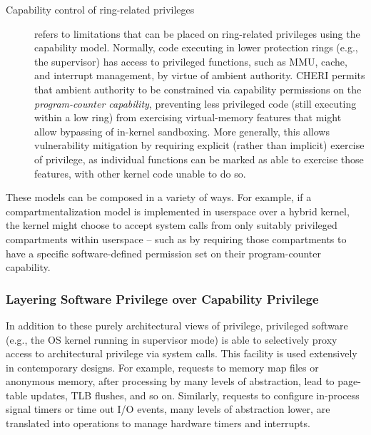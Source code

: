 \begin{description}
\item[Capability control of ring-related privileges] refers to limitations
  that can be placed on ring-related privileges using the capability model.
  Normally, code executing in lower protection rings (e.g., the supervisor) has
  access to privileged functions, such as MMU, cache, and interrupt
  management, by virtue of ambient authority.
  CHERI permits that ambient authority to be constrained via capability
  permissions on the \textit{program-counter capability}, preventing less
  privileged code (still executing within a low ring) from exercising
  virtual-memory features that might allow bypassing of in-kernel sandboxing.
  More generally, this allows vulnerability mitigation by requiring
  explicit (rather than implicit) exercise of privilege, as individual
  functions can be marked as able to exercise those features, with other
  kernel code unable to do so.
\end{description}

These models can be composed in a variety of ways.
For example, if a compartmentalization model is implemented in userspace over
a hybrid kernel, the kernel might choose to accept system calls from only
suitably privileged compartments within userspace -- such as by requiring
those compartments to have a specific software-defined permission set on their
program-counter capability.

\subsubsection{Layering Software Privilege over Capability Privilege}

In addition to these purely architectural views of privilege, privileged
software (e.g., the OS kernel running in supervisor mode) is able to
selectively proxy access to architectural privilege via system calls.
This facility is used extensively in contemporary designs.
For example, requests to memory
map files or anonymous memory, after processing by many levels of abstraction,
lead to page-table updates, TLB flushes, and so on.
Similarly, requests to configure in-process signal timers or time out I/O
events, many levels of abstraction lower, are translated into operations to
manage hardware timers and interrupts.

